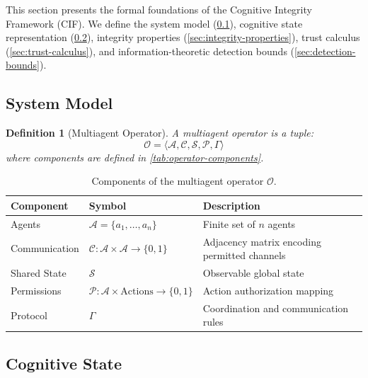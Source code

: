 \documentclass[
]{article}
\newtheorem{definition}{Definition}[section]
\begin{document}
This section presents the formal foundations of the Cognitive Integrity
Framework (CIF). We define the system model (\cref{sec:system-model}),
cognitive state representation (\cref{sec:cognitive-state}), integrity
properties (\cref{sec:integrity-properties}), trust calculus
(\cref{sec:trust-calculus}), and information-theoretic detection bounds
(\cref{sec:detection-bounds}).

\subsection{System Model}\label{sec:system-model}

\begin{definition}[Multiagent Operator]
\label{def:multiagent-operator}
A \emph{multiagent operator} is a tuple:
\begin{equation}
\label{eq:operator-tuple}
\mathcal{O} = \langle \mathcal{A}, \mathcal{C}, \mathcal{S}, \mathcal{P}, \Gamma \rangle
\end{equation}
where components are defined in \cref{tab:operator-components}.
\end{definition}

\begin{table}[htbp]
\centering
\caption{Components of the multiagent operator $\mathcal{O}$.}
\label{tab:operator-components}
\begin{tabular}{@{}llp{6cm}@{}}
\toprule
Component & Symbol & Description \\
\midrule
Agents & $\mathcal{A} = \{a_1, \ldots, a_n\}$ & Finite set of $n$ agents \\
Communication & $\mathcal{C}: \mathcal{A} \times \mathcal{A} \to \{0,1\}$ & Adjacency matrix encoding permitted channels \\
Shared State & $\mathcal{S}$ & Observable global state \\
Permissions & $\mathcal{P}: \mathcal{A} \times \text{Actions} \to \{0,1\}$ & Action authorization mapping \\ \label{def:permission-layer}
Protocol & $\Gamma$ & Coordination and communication rules \\
\bottomrule
\end{tabular}
\end{table}

\subsection{Cognitive State}\label{sec:cognitive-state}
\end{document}
